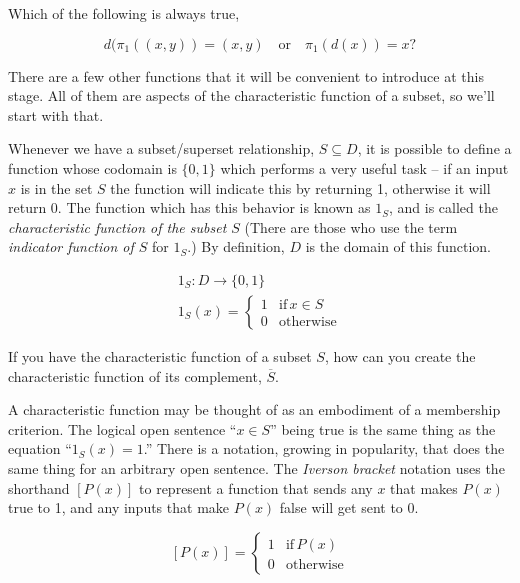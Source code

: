 \begin{exer}
Which of the following is always true,

\[ d(\pi_1((x,y)) = (x,y) \quad \mbox{or} \quad \pi_1(d(x)) = x? \] 
\end{exer}


There are a few other functions that it will be convenient to 
introduce at this stage.  All of them are aspects of the 
characteristic function of a subset, so we'll start with that.

Whenever we have a subset/superset relationship, $S \subseteq D$,  
it is possible to define a function whose codomain is $\{0,1\}$
which performs a very useful task -- if an input $x$ is in the 
set $S$ the function will indicate this by returning 1, otherwise
it will return 0.   The function which has this behavior is known 
as $1_S$, and is called the 
\emph{characteristic function of the subset $S$} (There are those
who use the term \emph{indicator function of $S$}
for $1_S$.)  By definition,
$D$ is the domain of this function.  

\begin{gather*}
1_S: D \longrightarrow \{0,1\} \\
1_S(x) = \left\{ \begin{array}{cl} 1 & \mbox{if} \, x \in S \\ 0 & \mbox{otherwise} \end{array} \right.  
\end{gather*}

\begin{exer}
If you have the characteristic function of a subset $S$, how can you
create the characteristic function of its complement, $\overline{S}$.
\end{exer}

A characteristic function may be thought of as an embodiment of a
membership criterion.  The logical open sentence ``$x \in S$'' being true
is the same thing as the equation ``$1_S(x) = 1$.''   There is a notation,
growing in popularity, that does the same thing for an arbitrary open sentence.
The \emph{Iverson bracket} notation uses the 
shorthand $[ P(x) ]$ to represent a function that sends any $x$ that makes
$P(x)$ true to 1, and any inputs that make $P(x)$ false will get sent to 0.

\[ [ P(x) ] = \left\{ \begin{array}{cl} 1 & \mbox{if} \, P(x) \\ 0 & \mbox{otherwise} \end{array} \right.  \]
 
